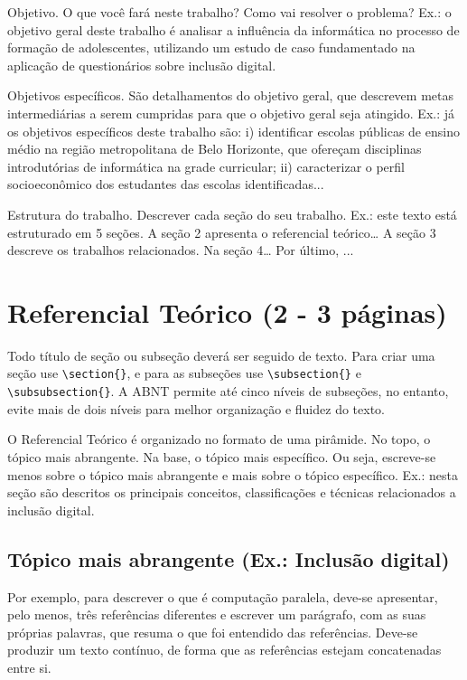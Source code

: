  Objetivo. O que você fará neste trabalho? Como vai resolver o problema?
	Ex.: o objetivo geral deste trabalho é analisar a influência da informática no processo de formação de adolescentes, utilizando um estudo de caso fundamentado na aplicação de questionários sobre inclusão digital.
	
 Objetivos específicos. São detalhamentos do objetivo geral, que descrevem metas intermediárias a serem cumpridas para que o objetivo geral seja atingido.
	Ex.: já os objetivos específicos deste trabalho são: i) identificar escolas públicas de ensino médio na região metropolitana de Belo Horizonte, que ofereçam disciplinas introdutórias de informática na grade curricular; ii) caracterizar o perfil socioeconômico dos estudantes das escolas identificadas...
	
 Estrutura do trabalho. Descrever cada seção do seu trabalho.	
	Ex.: este texto está estruturado em 5 seções. A seção 2 apresenta o referencial teórico… A seção 3 descreve os trabalhos relacionados. Na seção 4… Por último, ...


\estrutura\section{\esp Referencial Teórico (2 - 3 páginas)}\instrucao

Todo título de seção ou subseção deverá ser seguido de texto.  Para criar uma seção use \verb|\section{}|, e para as subseções use \verb|\subsection{}| e \verb|\subsubsection{}|. A ABNT permite até cinco níveis de subseções, no entanto, evite mais de dois níveis para melhor organização e fluidez do texto.


O Referencial Teórico é organizado no formato de uma pirâmide. No topo, o tópico mais abrangente. Na base, o tópico mais específico. Ou seja, escreve-se menos sobre o tópico mais abrangente e mais sobre o tópico específico. Ex.: nesta seção são descritos os principais conceitos, classificações e técnicas relacionados a inclusão digital. 

\estrutura\subsection{\esp Tópico mais abrangente (Ex.: Inclusão digital)}\instrucao 
\label{subsec:1}
Por exemplo, para descrever o que é computação paralela, deve-se apresentar, pelo menos, três referências diferentes e escrever um parágrafo, com as suas próprias palavras, que resuma o que foi entendido das referências. Deve-se produzir um texto contínuo, de forma que as referências estejam concatenadas entre si.

